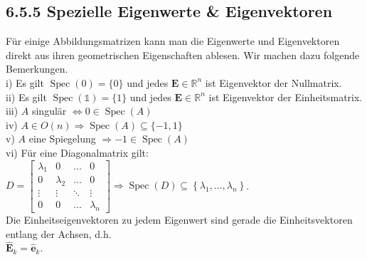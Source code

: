 \documentclass[10pt]{article}
\begin{document}
\subsection*{6.5.5 Spezielle Eigenwerte \& Eigenvektoren}
Für einige Abbildungsmatrizen kann man die Eigenwerte und Eigenvektoren direkt aus ihren geometrischen Eigenschaften ablesen. Wir machen dazu folgende Bemerkungen.\\
i) Es gilt $\operatorname{Spec}(0)=\{0\}$ und jedes $\mathbf{E} \in \mathbb{R}^{n}$ ist Eigenvektor der Nullmatrix.\\
ii) Es gilt $\operatorname{Spec}(\mathbb{1})=\{1\}$ und jedes $\mathbf{E} \in \mathbb{R}^{n}$ ist Eigenvektor der Einheitsmatrix.\\
iii) $A$ singulär $\Leftrightarrow 0 \in \operatorname{Spec}(A)$\\
iv) $A \in O(n) \Rightarrow \operatorname{Spec}(A) \subseteq\{-1,1\}$\\
v) $A$ eine Spiegelung $\Rightarrow-1 \in \operatorname{Spec}(A)$\\
vi) Für eine Diagonalmatrix gilt:\\
$D=\left[\begin{array}{rrlc}\lambda_{1} & 0 & \ldots & 0 \\ 0 & \lambda_{2} & \ldots & 0 \\ \vdots & \vdots & \ddots & \vdots \\ 0 & 0 & \ldots & \lambda_{n}\end{array}\right] \Rightarrow \operatorname{Spec}(D) \subseteq\left\{\lambda_{1}, \ldots, \lambda_{n}\right\}$.\\
Die Einheitseigenvektoren zu jedem Eigenwert sind gerade die Einheitsvektoren entlang der Achsen, d.h.\\
$\hat{\mathbf{E}}_{k}=\hat{\mathbf{e}}_{k}$.
\end{document}
